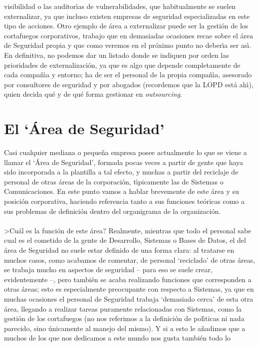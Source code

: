 visibilidad o las auditor\'{\i}as de vulnerabilidades, que habitualmente se
suelen externalizar, ya que incluso existen empresas de seguridad especializadas
en este tipo de acciones. Otro ejemplo de \'area a externalizar puede ser la
gesti\'on de los cortafuegos corporativos, trabajo que en demasiadas ocasiones
recae sobre el \'area de Seguridad propia y que como veremos en el pr\'oximo
punto no deber\'{\i}a ser as\'{\i}. En definitiva, no podemos dar un listado
donde se indiquen por orden las prioridades de externalizaci\'on, ya que es
algo que depende completamente de cada compa\~n\'{\i}a y entorno; ha de ser el
personal de la propia compa\~n\'{\i}a, asesorado por consultores de seguridad 
y por abogados (recordemos que la LOPD est\'a ah\'{\i}), quien decida qu\'e y
de qu\'e forma gestionar en {\it outsourcing}.
\section{El `\'Area de Seguridad'}
Casi cualquier mediana o peque\~na empresa posee actualmente lo que se viene a
llamar el `\'Area de Seguridad', formada pocas veces a partir de gente que haya
sido incorporada a la plantilla a tal efecto, y muchas a partir del reciclaje
de personal de otras \'areas de la corporaci\'on, t\'{\i}picamente las de 
Sistemas o Comunicaciones. En este punto vamos a hablar brevemente de este
\'area y su posici\'on corporativa, haciendo referencia tanto a sus funciones
te\'oricas como a sus problemas de definici\'on dentro del organigrama de la
organizaci\'on.\\
\\>Cu\'al es la funci\'on de este \'area? Realmente, mientras que todo el 
personal sabe cual es el cometido de la gente de Desarrollo, Sistemas o Bases
de Datos, el del \'area de Seguridad no suele estar definido de una forma 
clara: al tratarse en muchos casos, como acabamos de comentar, de personal 
`reciclado' de otras \'areas, se trabaja mucho en aspectos de seguridad --
para eso se suele crear, evidentemente --, pero tambi\'en se acaba realizando
funciones que corresponden a otras \'areas; esto es 
especialmente preocupante con respecto a Sistemas, ya que en muchas ocasiones
el personal de Seguridad trabaja `demasiado cerca' de esta otra \'area, llegando
a realizar tareas puramente relacionadas con Sistemas, como la gesti\'on de los
cortafuegos (no nos referimos a la definici\'on de pol\'{\i}ticas ni nada 
parecido, sino \'unicamente al manejo del mismo). Y si a esto le a\~nadimos que
a muchos de los que nos dedicamos a este mundo nos gusta tambi\'en todo lo 
